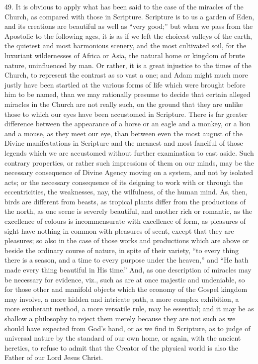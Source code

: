 49.
It is obvious to apply what has been said to the case of the miracles
of the Church, as compared with those in Scripture. Scripture is to us
a garden of Eden, and its creations are beautiful as well as ``very
good;'' but when we pass from the Apostolic to the following ages, it
is as if we left the choicest valleys of the earth, the quietest and
most harmonious scenery, and the most cultivated soil, for the
luxuriant wildernesses of Africa or Asia, the natural home or kingdom
of brute nature, uninfluenced by man. Or rather, it is a great
injustice to the times of the Church, to represent the contrast as so
vast a one; and Adam might much more justly have been startled at the
various forms of life which were brought before him to be named, than
we may rationally presume to decide that certain alleged miracles in
the Church are not really such, on the ground that they are unlike
those to which our eyes have been accustomed in Scripture. There is
far greater difference between the appearance of a horse or an eagle
and a monkey, or a lion and a mouse, as they meet our eye, than
between even the most august of the Divine manifestations in Scripture
and the meanest and most fanciful of those legends which we are
accustomed without further examination to cast aside. Such contrary
properties, or rather such impressions of them on our minds, may be
the necessary consequence of Divine Agency moving on a system, and not
by isolated acts; or the necessary consequence of its deigning to work
with or through the eccentricities, the weaknesses, nay, the
wilfulness, of the human mind. As, then, birds are different from
beasts, as tropical plants differ from the productions of the
north, as one scene is severely beautiful, and another rich or
romantic, as the excellence of colours is incommensurate with
excellence of form, as pleasures of sight have nothing in common with
pleasures of scent, except that they are pleasures; so also in the
case of those works and productions which are above or beside the
ordinary course of nature, in spite of their variety, ``to every thing
there is a season, and a time to every purpose under the heaven,'' and ``He
hath made every thing beautiful in His time.'' And, as one description
of miracles may be necessary for evidence, viz., such as are at once
majestic and undeniable, so for those other and manifold objects which
the economy of the Gospel kingdom may involve, a more hidden and
intricate path, a more complex exhibition, a more exuberant method, a
more versatile rule, may be essential; and it may be as shallow a
philosophy to reject them merely because they are not such as we
should have expected from God's hand, or as we find in Scripture, as
to judge of universal nature by the standard of our own home, or
again, with the ancient heretics, to refuse to admit that the Creator
of the physical world is also the Father of our Lord Jesus Christ.

